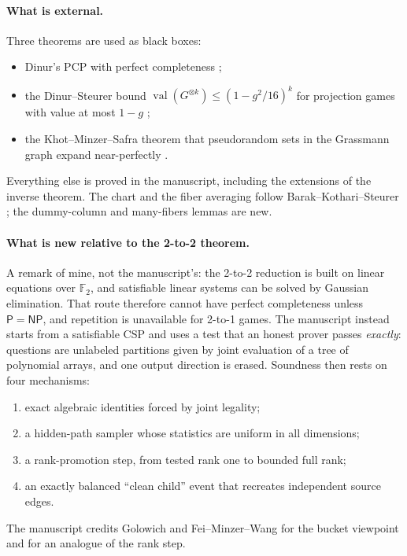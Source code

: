 \documentclass[11pt]{article}
\theoremstyle{definition}
\theoremstyle{remark}
\DeclareMathOperator{\val}{val}
\newcommand{\Fb}{\mathbb F_2}
\begin{document}
\paragraph{What is external.} Three theorems are used as black boxes:
\begin{itemize}
\item Dinur's PCP with perfect completeness \cite{Dinur};
\item the Dinur--Steurer bound $\val(G^{\otimes k})\le(1-g^2/16)^k$ for
projection games with value at most $1-g$ \cite{DS};
\item the Khot--Minzer--Safra theorem that pseudorandom sets in the Grassmann
graph expand near-perfectly \cite{KMS18}.
\end{itemize}
Everything else is proved in the manuscript, including the extensions of the
inverse theorem. The chart and the fiber averaging follow
Barak--Kothari--Steurer \cite{BKS}; the dummy-column and many-fibers lemmas
are new.

\paragraph{What is new relative to the 2-to-2 theorem.} A remark of mine,
not the manuscript's: the 2-to-2 reduction is built on linear equations over
$\Fb$, and satisfiable linear systems can be solved by Gaussian elimination.
That route therefore cannot have perfect completeness unless
$\mathsf P=\mathsf{NP}$, and repetition is unavailable for 2-to-1 games. The
manuscript instead starts from a satisfiable CSP and uses a test that an
honest prover passes
\emph{exactly}: questions are unlabeled partitions given by joint evaluation of
a tree of polynomial arrays, and one output direction is erased. Soundness
then rests on four mechanisms:
\begin{enumerate}
\item exact algebraic identities forced by joint legality;
\item a hidden-path sampler whose statistics are uniform in all dimensions;
\item a rank-promotion step, from tested rank one to bounded full rank;
\item an exactly balanced ``clean child'' event that recreates independent
source edges.
\end{enumerate}
The manuscript credits Golowich \cite{Golowich} and Fei--Minzer--Wang
\cite{FMW} for the bucket viewpoint and for an analogue of the rank step.
\end{document}
